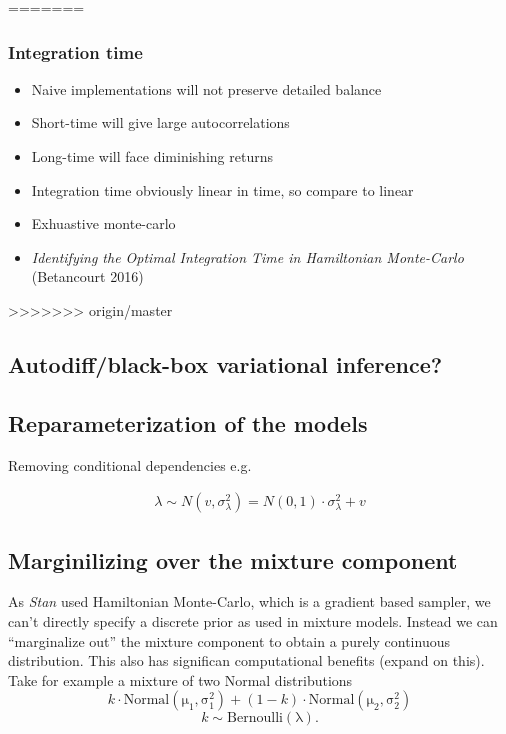 \documentclass{article}
\begin{document}
=======
\subsubsection{Integration time}

\begin{itemize}
\item Naive implementations will not preserve detailed balance
\item Short-time will give large autocorrelations
\item Long-time will face diminishing returns
\item Integration time obviously linear in time, so compare to linear
\item Exhuastive monte-carlo
\item \emph{Identifying the Optimal Integration Time in Hamiltonian Monte-Carlo} (Betancourt 2016)
\end{itemize}

>>>>>>> origin/master
\subsection{Autodiff/black-box variational inference?}

\subsection{Reparameterization of the models}

Removing conditional dependencies e.g.

\begin{align*}
\lambda \sim N(v, \sigma^2_\lambda) = N(0, 1) \cdot \sigma_\lambda^2 + v
\end{align*}

\subsection{Marginilizing over the mixture component}

As \emph{Stan} used Hamiltonian Monte-Carlo, which is a gradient based sampler, we can't directly specify a discrete prior as used in mixture models. Instead we can ``marginalize out'' the mixture component to obtain a purely continuous distribution. This also has significan computational benefits (expand on this). \\

Take for example a mixture of two Normal distributions
\begin{equation}
  k \cdot \operatorname{Normal(\mu_1, \sigma_1^2)} + (1 - k) \cdot \operatorname{Normal(\mu_2, \sigma_2^2)}
\end{equation} 
\begin{equation}
  k \sim \operatorname{Bernoulli(\lambda)}.
\end{equation}
\end{document}
